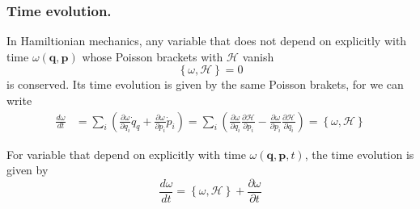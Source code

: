 \documentclass[../../../main.tex]{subfiles}
\begin{document}
\subsubsection*{Time evolution.}
In Hamiltionian mechanics, any variable that does not depend on explicitly with time $\omega(\mathbf{q},\mathbf{p}) 	$ whose Poisson brackets with $\mathcal{H }$ vanish 
\begin{equation*}
	\left\{ \omega,\mathcal{H } \right\}=0
\end{equation*}
is conserved.
Its time evolution is given by the same Poisson brakets, for we can write 
\begin{align*}
	\frac{d \omega}{dt}&= \sum_i \left( \frac{\partial \omega }{\partial q_i }\dot{q}_q+\frac{\partial \omega }{\partial p_i}\dot{p}_i \right) = \sum_i \left( \frac{\partial \omega }{\partial q_i }\frac{\partial \mathcal{H}}{\partial p_i 	}-\frac{\partial\omega }{\partial p_i }\frac{\partial \mathcal{H }}{\partial q_i } \right) =\left\{ \omega,\mathcal{H} \right\}
\end{align*}

For variable that depend on explicitly with time $\omega(\mathbf{q}, \mathbf{p },t )$, the time evolution is given by 
\begin{equation*}
	\frac{d \omega }{dt}=\left\{ \omega,\mathcal{H } \right\}+\frac{\partial \omega }{\partial t}
\end{equation*}
\end{document}

